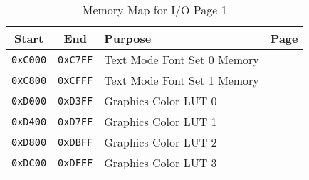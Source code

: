 \begin{table}[ht]
    \begin{center}
        \begin{tabular}{|c|c|l|l|} \hline
            Start & End & Purpose & Page \\ \hline\hline
            \verb+0xC000+ & \verb+0xC7FF+ & Text Mode Font Set 0 Memory & \pageref{sec:text_font} \\ \hline
            \verb+0xC800+ & \verb+0xCFFF+ & Text Mode Font Set 1 Memory & \pageref{sec:text_font} \\ \hline
            \verb+0xD000+ & \verb+0xD3FF+ & Graphics Color LUT 0 & \multirow{4}{*}{\pageref{tab:graph_cluts}} \\ \cline{1-3}
            \verb+0xD400+ & \verb+0xD7FF+ & Graphics Color LUT 1 & \\ \cline{1-3}
            \verb+0xD800+ & \verb+0xDBFF+ & Graphics Color LUT 2 & \\ \cline{1-3}
            \verb+0xDC00+ & \verb+0xDFFF+ & Graphics Color LUT 3 & \\ \hline
        \end{tabular}
    \end{center}
    \caption{Memory Map for I/O Page 1}
    \label{tab:map_io_1}
\end{table}
